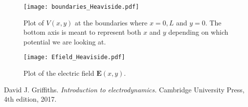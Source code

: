 \documentclass{article}
\begin{document}
\begin{figure}[!htb]
\centering
\texttt{[image: boundaries\_Heaviside.pdf]}{}
\caption{Plot of $V(x,y)$ at the boundaries where $x=0,L$ and $y=0$. The bottom axis is meant to represent both $x$ and $y$ depending on which potential we are looking at.}
\label{fig: boundaries_Heaviside}
\end{figure}

\begin{figure}[!htbp]
\centering
\texttt{[image: Efield\_Heaviside.pdf]}{}
\caption{Plot of the electric field $\boldsymbol{E}(x,y)$.}
\label{fig: Efield_Heaviside}
\end{figure}
\FloatBarrier

\begin{thebibliography}{}
David J. Griffiths. \emph{Introduction to electrodynamics.} Cambridge University Press, 4th edition, 2017.

\end{thebibliography}
\end{document}
